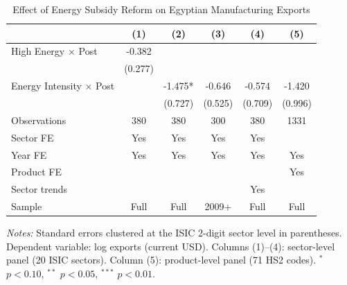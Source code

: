 \begin{table}[htbp]
\centering
\caption{Effect of Energy Subsidy Reform on Egyptian Manufacturing Exports}
\label{tab:main}
\begin{tabular}{lccccc}
\toprule
 & (1) & (2) & (3) & (4) & (5) \\
\midrule
High Energy $\times$ Post & -0.382 & & & & \\
 & (0.277) & & & & \\
Energy Intensity $\times$ Post & & -1.475* & -0.646 & -0.574 & -1.420 \\
 & & (0.727) & (0.525) & (0.709) & (0.996) \\
\midrule
Observations & 380 & 380 & 300 & 380 & 1331 \\
Sector FE & Yes & Yes & Yes & Yes & \\
Year FE & Yes & Yes & Yes & Yes & Yes \\
Product FE & & & & & Yes \\
Sector trends & & & & Yes & \\
Sample & Full & Full & 2009+ & Full & Full \\
\bottomrule
\end{tabular}
\begin{tablenotes}
\small
\item \textit{Notes:} Standard errors clustered at the ISIC 2-digit sector level in parentheses. Dependent variable: log exports (current USD). Columns (1)--(4): sector-level panel (20 ISIC sectors). Column (5): product-level panel (71 HS2 codes). $^{*}$ $p < 0.10$, $^{**}$ $p < 0.05$, $^{***}$ $p < 0.01$.
\end{tablenotes}
\end{table}
